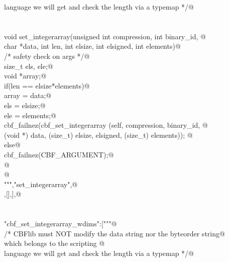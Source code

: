 \documentclass[10pt,a4paper,twoside,notitlepage]{article}
\begin{document}
\begin{flushleft}
\begin{minipage}{\linewidth}
\begin{list}{}{}
\mbox{}\verb@       language we will get and check the length via a typemap */@\\
\mbox{}\verb@@\\
\mbox{}\verb@%apply (char *STRING, int LENGTH) { (char *data, int len) } set_integerarray;@\\
\mbox{}\verb@@\\
\mbox{}\verb@    void set_integerarray(unsigned int compression, int binary_id, @\\
\mbox{}\verb@             char *data, int len, int elsize, int elsigned, int elements){@\\
\mbox{}\verb@        /* safety check on args */@\\
\mbox{}\verb@        size_t els, ele;@\\
\mbox{}\verb@        void *array;@\\
\mbox{}\verb@        if(len == elsize*elements){@\\
\mbox{}\verb@           array = data;@\\
\mbox{}\verb@           els = elsize;@\\
\mbox{}\verb@           ele = elements;@\\
\mbox{}\verb@           cbf_failnez(cbf_set_integerarray (self, compression, binary_id, @\\
\mbox{}\verb@           (void *) data,  (size_t) elsize, elsigned, (size_t) elements)); @\\
\mbox{}\verb@        }else{@\\
\mbox{}\verb@           cbf_failnez(CBF_ARGUMENT);@\\
\mbox{}\verb@        }@\\
\mbox{}\verb@    }@\\
\mbox{}\verb@""","set_integerarray",@\\
\mbox{},[],],@\\
\mbox{}\verb@@\\
\mbox{}\verb@@\\
\mbox{}\verb@"cbf_set_integerarray_wdims":["""@\\
\mbox{}\verb@    /* CBFlib must NOT modify the data string nor the byteorder string@\\
\mbox{}\verb@       which belongs to the scripting @\\
\mbox{}\verb@       language we will get and check the length via a typemap */@\\

\end{list}
\end{minipage}
\end{flushleft}
\end{document}
